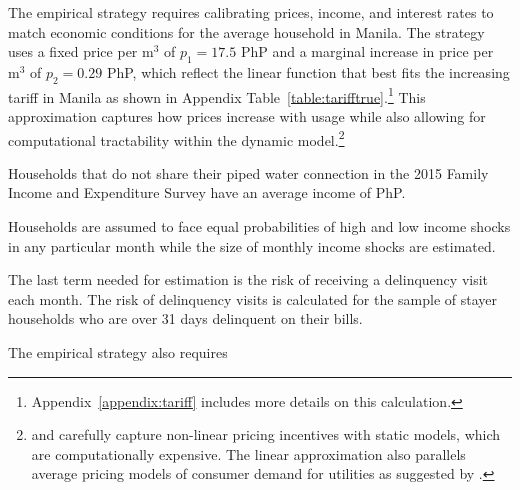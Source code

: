 \documentclass[12pt]{article}
\begin{document}
The empirical strategy requires calibrating prices, income, and interest rates to match economic conditions for the average household in Manila.  The strategy uses a fixed price per $\text{m}^{3}$ of $p_1=17.5$ PhP and a marginal increase in price per $\text{m}^{3}$ of $p_2=0.29$ PhP, which reflect the linear function that best fits the increasing tariff in Manila as shown in Appendix Table~\ref{table:tarifftrue}.\footnote{Appendix~\ref{appendix:tariff} includes more details on this calculation. }  This approximation captures how prices increase with usage while also allowing for computational tractability within the dynamic model.\footnote{\cite{wjv} and \cite{szabo2015value} carefully capture non-linear pricing incentives with static models, which are computationally expensive.  The linear approximation also parallels average pricing models of consumer demand for utilities as suggested by \cite{ito2014consumers}.}  

Households that do not share their piped water connection in the 2015 Family Income and Expenditure Survey have an average income of PhP.  




Households are assumed to face equal probabilities of high and low income shocks in any particular month while the size of monthly income shocks are estimated.  


The last term needed for estimation is the risk of receiving a delinquency visit each month.  The risk of delinquency visits is calculated for the sample of stayer households who are over 31 days delinquent on their bills. 



The empirical strategy also requires 
\end{document}
